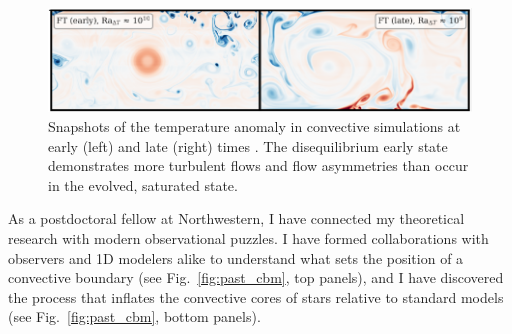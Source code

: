 \documentclass[12pt]{article} %
\begin{document}
\begin{figure}[b!]
     \centering
     \captionsetup{width=0.97\linewidth}
     \includegraphics[width=\textwidth]{past_ae.pdf}
        \caption{Snapshots of the temperature anomaly in convective simulations at
early (left) and late (right) times \citep{anders_etal_2020}. 
The disequilibrium early state demonstrates more turbulent flows and flow asymmetries than occur in the evolved, saturated state.
        \label{fig:past_ae}}
\end{figure}

As a postdoctoral fellow at Northwestern, I have connected my theoretical research with modern observational puzzles.
I have formed collaborations with observers and 1D modelers alike to understand what sets the position of a convective boundary \citep{anders_etal_2022b} (see Fig.~\ref{fig:past_cbm}, top panels), and I have discovered the process that inflates the convective cores of stars relative to standard models \citep{anders_etal_2022a} (see Fig.~\ref{fig:past_cbm}, bottom panels).
\end{document}

